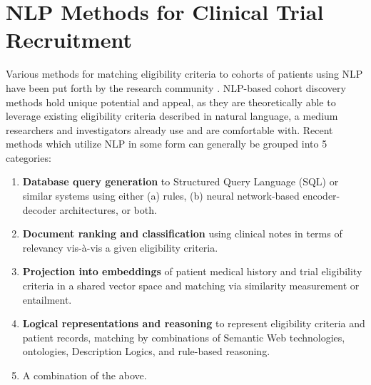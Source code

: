 \documentclass[../main.tex]{subfiles}
\begin{document}
\section{NLP Methods for Clinical Trial Recruitment}

Various methods for matching eligibility criteria to cohorts of patients using NLP have been put forth by the research community \cite{yuan2019criteria2query, soni2020patient, fang2022combining, zhang2020deepenroll, chen2019clinical, patrao2015recruit, dhayne2021emr2vec, liu2021evaluating, xiong2019cohort}. NLP-based cohort discovery methods hold unique potential and appeal, as they are theoretically able to leverage existing eligibility criteria described in natural language, a medium researchers and investigators already use and are comfortable with. Recent methods which utilize NLP in some form can generally be grouped into 5 categories:

\begin{enumerate}
    \item{\textbf{Database query generation} to Structured Query Language (SQL) or similar systems using either (a) rules, (b) neural network-based encoder-decoder architectures}, or both.
    \item{\textbf{Document ranking and classification} using clinical notes in terms of relevancy vis-à-vis a given eligibility criteria.}
    \item{\textbf{Projection into embeddings} of patient medical history and trial eligibility criteria in a shared vector space and matching via similarity measurement or entailment.}
    \item{\textbf{Logical representations and reasoning} to represent eligibility criteria and patient records, matching by combinations of Semantic Web technologies, ontologies, Description Logics, and rule-based reasoning.}
    \item{A combination of the above.}
\end{enumerate}
\end{document}
